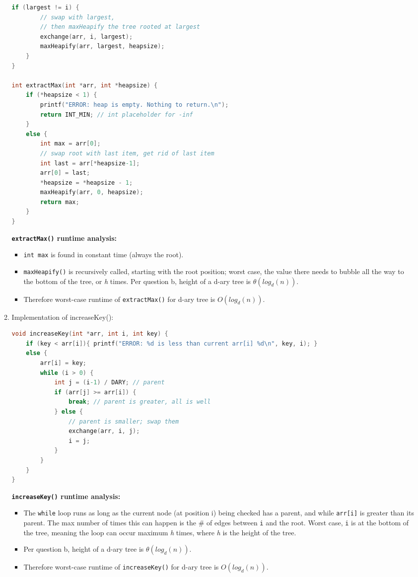 \documentclass{article}
\begin{document}
\begin{enumerate}
\begin{enumerate}
\begin{lstlisting}[language=C,style=CStyle]
	if (largest != i) {
		// swap with largest, 
		// then maxHeapify the tree rooted at largest
		exchange(arr, i, largest);
		maxHeapify(arr, largest, heapsize);
	}
}

int extractMax(int *arr, int *heapsize) {
	if (*heapsize < 1) {
		printf("ERROR: heap is empty. Nothing to return.\n");
		return INT_MIN; // int placeholder for -inf
	} 
	else {
		int max = arr[0];
		// swap root with last item, get rid of last item
		int last = arr[*heapsize-1];
		arr[0] = last;
		*heapsize = *heapsize - 1;
		maxHeapify(arr, 0, heapsize);
		return max;
	}
}
		\end{lstlisting} 
		
		\textbf{\texttt{extractMax()} runtime analysis:}
		\begin{itemize}
		\item \texttt{int max} is found in constant time (always the root).
		
		\item \texttt{maxHeapify()} is recursively called, starting with the root position; worst case, the value there needs to bubble all the way to the bottom of the tree, or \textit{h} times.
		Per question b, height of a d-ary tree is $\theta(log_{d}(n))$.
		
		\item Therefore worst-case runtime of \texttt{extractMax()} for d-ary tree is $O(log_{d}(n))$.
		
		\end{itemize}
		\newpage
		\item Implementation of increaseKey():
\begin{lstlisting}[language=C,style=CStyle]
void increaseKey(int *arr, int i, int key) {
	if (key < arr[i]){ printf("ERROR: %d is less than current arr[i] %d\n", key, i); }
	else {
		arr[i] = key;
		while (i > 0) {
			int j = (i-1) / DARY; // parent
			if (arr[j] >= arr[i]) {
				break; // parent is greater, all is well
			} else {
				// parent is smaller; swap them
				exchange(arr, i, j);
				i = j;
			}
		}
	}
}
\end{lstlisting}
		
		\textbf{\texttt{increaseKey()} runtime analysis:}
		\begin{itemize}
		\item The \texttt{while} loop runs as long as the current node (at position i) being checked has a parent, and while \texttt{arr[i]} is greater than its parent. The max number of times this can happen is the \# of edges between \texttt{i} and the root. Worst case, \texttt{i} is at the bottom of the tree, meaning the loop can occur maximum \textit{h} times, where \textit{h} is the height of the tree.
		\item Per question b, height of a d-ary tree is $\theta(log_{d}(n))$.
		\item Therefore worst-case runtime of \texttt{increaseKey()} for d-ary tree is $O(log_{d}(n))$.
		\end{itemize}
		

\end{enumerate}
\end{enumerate}
\end{document}
